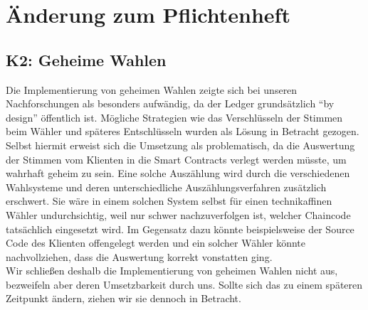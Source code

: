 \documentclass[parskip=full]{scrartcl}
\begin{document}
	\section{Änderung zum Pflichtenheft}
	\subsection{K2: Geheime Wahlen}
	Die Implementierung von geheimen Wahlen zeigte sich bei unseren Nachforschungen als besonders aufwändig, da der Ledger grundsätzlich \enquote{by design} öffentlich ist. Mögliche Strategien wie das Verschlüsseln der Stimmen beim Wähler und späteres Entschlüsseln wurden als Lösung in Betracht gezogen. Selbst hiermit erweist sich die Umsetzung als problematisch, da die Auswertung der Stimmen vom Klienten in die Smart Contracts verlegt werden müsste, um wahrhaft geheim zu sein. Eine solche Auszählung wird durch die verschiedenen Wahlsysteme und deren unterschiedliche Auszählungsverfahren zusätzlich erschwert. Sie wäre in einem solchen System selbst für einen technikaffinen Wähler undurchsichtig, weil nur schwer nachzuverfolgen ist, welcher Chaincode tatsächlich eingesetzt wird. Im Gegensatz dazu könnte beispielsweise der Source Code des Klienten offengelegt werden und ein solcher Wähler könnte nachvollziehen, dass die Auswertung korrekt vonstatten ging. \\ Wir schließen deshalb die Implementierung von geheimen Wahlen nicht aus, bezweifeln aber deren Umsetzbarkeit durch uns. Sollte sich das zu einem späteren Zeitpunkt ändern, ziehen wir sie dennoch in Betracht.
\end{document}

